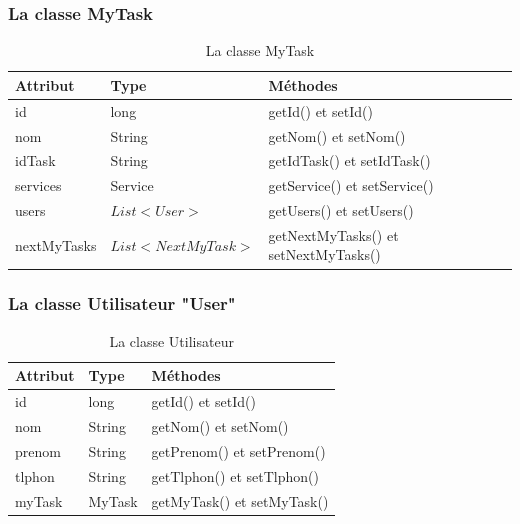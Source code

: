 \subsubsection{La classe MyTask}
\begin{table}[H]
	\centering
	\begin{tabular}{|l|l|l|}
		\hline
		\textbf{Attribut}  & \textbf{Type} & \multicolumn{1}{l|}{\textbf{Méthodes}} \\ \hline
		
		id & long & getId() et setId()\\ \cline{1-2}
		nom & String  & getNom() et setNom() \\ \cline{1-2}
			idTask & String & getIdTask() et setIdTask()\\ \cline{1-2}
		services & Service  & getService() et setService() \\ \cline{1-2}
				users	& $ List<User> $ & getUsers() et setUsers()   \\ \cline{1-2}	
				
		nextMyTasks	& $ List<NextMyTask> $ & getNextMyTasks() et setNextMyTasks()   \\ \hline
	\end{tabular}
	\caption{La classe MyTask}
\label{fig:class3}
\end{table}




\subsubsection{La classe Utilisateur "User"}
\begin{table}[H]
	\centering\setlength\tabcolsep{1cm}
	
	\begin{tabular}{|l|l|l|}
		\hline
		\textbf{Attribut}  & \textbf{Type} & \multicolumn{1}{l|}{\textbf{Méthodes}} \\ \hline
		
		id & long & getId() et setId()\\ \cline{1-2}
		nom & String & getNom() et setNom()\\ \cline{1-2}
			prenom & String & getPrenom() et setPrenom()\\ \cline{1-2}
						tlphon & String & getTlphon() et setTlphon()\\ \cline{1-2}
		myTask & MyTask  & getMyTask() et setMyTask()   \\ \hline
	\end{tabular}	\caption{La classe Utilisateur}
\label{fig:class6}
\end{table}



